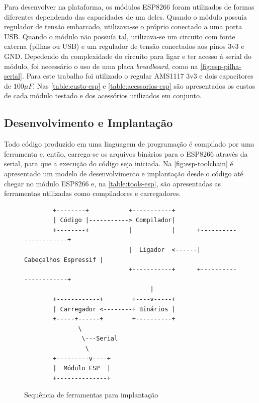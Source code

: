 Para desenvolver na plataforma, os módulos ESP8266 foram utilizados de formas
diferentes dependendo das capacidades de um deles. Quando o módulo possuía
regulador de tensão embarcado, utilizava-se o próprio conectado a uma porta USB.
Quando o módulo não possuía tal, utilizava-se um circuito com fonte externa
(pilhas ou USB) e um regulador de tensão conectados aos pinos 3v3 e
GND. Depedendo da complexidade do circuito para ligar e ter acesso à
serial do módulo, foi necessário o uso de uma placa \emph{breadboard}, como na
\autoref{fig:esp-pilha-serial}. Para este trabalho foi utilizado o regular
AMS1117 3v3 e dois capacitores de $100 \mu F$. Nas
\autoref{table:custo-esp} e \autoref{table:acessorios-esp} são apresentados os
custos de cada módulo testado e dos acessórios utilizados em conjunto.


\subsection{Desenvolvimento e Implantação}
\label{subsec:dev-esp}

Todo código produzido em uma linguagem de programação é compilado por uma
ferramenta e, então, carrega-se os arquivos binários para o ESP8266 através da
serial, para que a execução do código seja iniciada. Na
\autoref{fig:esp-toolchain} é apresentado um modelo de desenvolvimento e
implantação desde o código até chegar no módulo ESP8266 e, na \autoref{table:tools-esp},
são apresentadas as ferramentas utilizadas como compiladores e carregadores.

\begin{figure}[htb]
	\caption{\label{fig:esp-toolchain}Sequência de ferramentas para implantação}
	\begin{center}
		\begin{verbatim}
		+--------+           +-----------+
		| Código |-----------> Compilador|
		+--------+           |           |      +----------------------+
		                     |  Ligador  <------| Cabeçalhos Espressif |
		                     +-----------+      +----------------------+
		                           |
		+------------+        +----v-----+
		| Carregador <--------+ Binários |
		+-----+------+        +----------+
		       \
		        \---Serial
		         \
		+---------v----+
		|  Módulo ESP  |
		+--------------+
		\end{verbatim}
	\end{center}
\end{figure}

